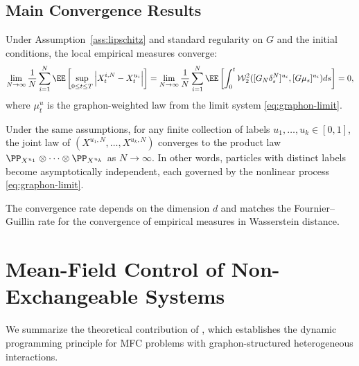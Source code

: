 \documentclass[11pt]{article}
\begin{document}
\subsection{Main Convergence Results}

\begin{theorem}\label{thm:lln}
  Under Assumption~\ref{ass:lipschitz} and standard regularity on $G$ and the initial conditions, the local empirical measures converge:
  \begin{equation}
    \lim_{N \to \infty} \frac{1}{N} \sum_{i=1}^N \EE\left[ \sup_{0 \leq t \leq T} \left| X_t^{i, N} - X_t^{u_i} \right| \right] = \lim_{N \to \infty} \frac{1}{N} \sum_{i=1}^N \EE\left[ \int_{0}^{t} \mathcal{W}_2^2 ([G_N \delta_s^N]^{u_i}, [G\mu_s]^{u_i}) ds \right] = 0,
  \end{equation}
  where $\mu_t^u$ is the graphon-weighted law from the limit system \eqref{eq:graphon-limit}.
\end{theorem}

\begin{theorem}\label{thm:poc}
  Under the same assumptions, for any finite collection of labels $u_1, \ldots, u_k \in [0,1]$, the joint law of $(X^{u_1,N}, \ldots, X^{u_k,N})$ converges to the product law $\PP_{X^{u_1}} \otimes \cdots \otimes \PP_{X^{u_k}}$ as $N \to \infty$. In other words, particles with distinct labels become asymptotically independent, each governed by the nonlinear process \eqref{eq:graphon-limit}.
\end{theorem}

The convergence rate depends on the dimension $d$ and matches the Fournier--Guillin rate \citep{fournier2015rate} for the convergence of empirical measures in Wasserstein distance.


\section{Mean-Field Control of Non-Exchangeable Systems}\label{sec:appendix-nonexch}

We summarize the theoretical contribution of \citet{decrescenzo2026mfc}, which establishes the dynamic programming principle for MFC problems with graphon-structured heterogeneous interactions.
\end{document}

